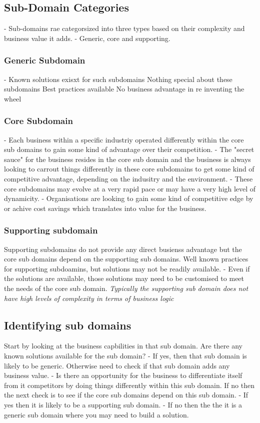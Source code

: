 \documentclass[a4paper, 11pt]{book}
\begin{document}
    \subsection{Sub-Domain Categories}
    - Sub-domains rae categorsized into three types based on their complexity and business value it adds.
    - Generic, core and supporting.

    \subsubsection{Generic Subdomain}
    - Known solutions exisxt for such subdomains
    Nothing special about these subdomains
    Best practices available
    No business advantage in re inventing the wheel

    \subsubsection{Core Subdomain}
    - Each business within a specific industriy operated differently within the core sub domains to gain some kind of advantage over their competition.
    - The "secret sauce" for the business resides in the core sub domain and the business is always looking to carrout things differently in these core subdomains to get some kind of competitive advantage, depending on the indusitry and the environment.
    - These core subdomains may evolve at a very rapid pace or may have a very high level of dynamicity.
    - Organisations are looking to gain some kind of competitive edge by or achive cost savings which translates into value for the business.

    \subsubsection{Supporting subdomain}
    Supporting subdomains do not provide any direct busienss advantage but the core sub domains depend on the supporting sub domains.
    Well known practices for supporting subdoamins, but solutions may not be readily available.
    - Even if the solutions are available, those solutions may need to be customised to meet the needs of the core sub domain.
    \textit{Typically the supporting sub domain does not have high levels of complexity in terms of business logic}

    \subsection{Identifying sub domains}
    Start by looking at the business capbilities in that sub domain.
    Are there any known solutions available for the sub domain?
    - If yes, then that sub domain is likely to be generic.
    Otherwise need to check if that sub domain adds any business value.
    - Is there an opportunity for the business to differentiate itself from it competitors by doing things differently within this sub domain.
    If no then the next check is to see if the core sub domains depend on this sub domain.
    - If yes then it is likely to be a supporting sub domain.
    - If no then the the it is a generic sub domain where you may need to build a solution.
\end{document}
